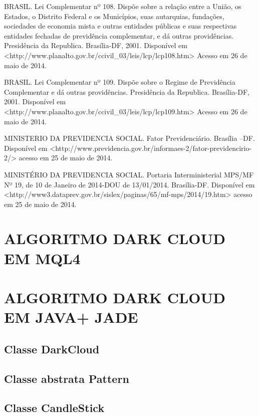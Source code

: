 \begin{apendicesenv}
BRASIL. Lei Complementar nº 108. Dispõe sobre a relação entre a União, os Estados, o Distrito Federal e os Municípios, suas autarquias, fundações, sociedades de economia mista e outras entidades públicas e suas respectivas entidades fechadas de previdência complementar, e dá outras providências. Presidência da Republica. Brasília-DF, 2001. Disponível em  <http://www.planalto.gov.br/ccivil\_03/leis/lcp/lcp108.htm> Acesso em 26 de maio de 2014.

BRASIL. Lei Complementar nº 109. Dispõe sobre o Regime de Previdência Complementar e dá outras providências. Presidência da Republica. Brasília-DF, 2001. Disponível em <http://www.planalto.gov.br/ccivil\_03/leis/lcp/lcp109.htm> Acesso em 26 de maio de 2014.

MINISTERIO DA PREVIDENCIA SOCIAL. Fator Previdenciário. Brasília –DF. Disponível em <http://www.previdencia.gov.br/informaes-2/fator-previdencirio-2/> acesso em 25 de maio de 2014.

MINISTÉRIO DA PREVIDENCIA SOCIAL. Portaria Interministerial MPS/MF Nº 19, de 10 de Janeiro de 2014-DOU de 13/01/2014. Brasília-DF. Disponível em <http://www3.dataprev.gov.br/sislex/paginas/65/mf-mps/2014/19.htm>   acesso em 25 de maio de 2014.

\chapter{ALGORITMO DARK CLOUD EM MQL4}


\chapter{ALGORITMO DARK CLOUD EM JAVA+ JADE}
\section{Classe DarkCloud}


\section{Classe abstrata Pattern}


\section{Classe CandleStick}




\end{apendicesenv}
